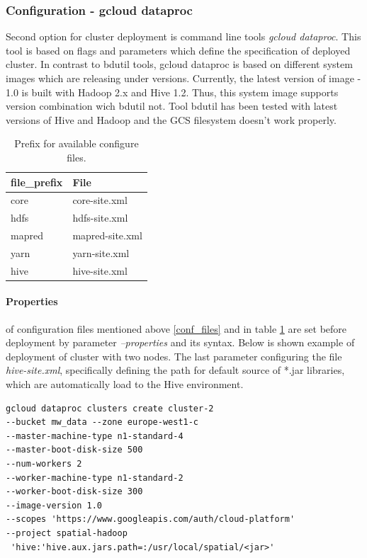 \documentclass[a4paper,12pt,oneside]{report}
\begin{document}
	
	
	
	\subsubsection{Configuration - gcloud dataproc}
    Second option for cluster deployment is command line tools \textit{gcloud
    	dataproc}. This tool is based on flags and parameters which define the specification
    of deployed cluster. In contrast to bdutil tools, gcloud dataproc is based on
    different system images which are releasing under versions. Currently, the latest
    version of image - 1.0 is built with Hadoop 2.x and Hive 1.2. Thus, this system image 
    supports version combination wich bdutil not. Tool bdutil has been tested with latest 
    versions of Hive and Hadoop and the GCS filesystem doesn’t work properly.  
	\begin{table}[!htbp]
		\centering
		\begin{scriptsize}
			\begin{tabular}{@{}|l|l|@{}}
				\toprule 
				file\_prefix & File            \\ \midrule \midrule
				core         & core-site.xml   \\ \midrule
				hdfs         & hdfs-site.xml   \\ \midrule
				mapred       & mapred-site.xml \\ \midrule
				yarn         & yarn-site.xml   \\ \midrule
				hive         & hive-site.xml   \\ \bottomrule
			\end{tabular}
		\end{scriptsize}
		\caption{Prefix for available configure files.}
		\label{config_table}
	\end{table}
	\paragraph{Properties} of configuration files mentioned above \ref{conf_files}
	and in table \ref{config_table} are set before deployment by parameter
	\textit{--properties} and its syntax. Below is shown example of deployment of cluster
	with two nodes. The last parameter configuring the file \textit{hive-site.xml}, 
	specifically defining the path for default source of *.jar libraries, which are
	automatically load to the Hive environment. \cite{gcloud_dataproc}
	\begin{footnotesize}
		\begin{lstlisting}[style=python]
gcloud dataproc clusters create cluster-2 
--bucket mw_data --zone europe-west1-c
--master-machine-type n1-standard-4 
--master-boot-disk-size 500 
--num-workers 2
--worker-machine-type n1-standard-2 
--worker-boot-disk-size 300 
--image-version 1.0 
--scopes 'https://www.googleapis.com/auth/cloud-platform' 
--project spatial-hadoop
 'hive:'hive.aux.jars.path=:/usr/local/spatial/<jar>'
		\end{lstlisting}
	\end{footnotesize}
    
\end{document}
